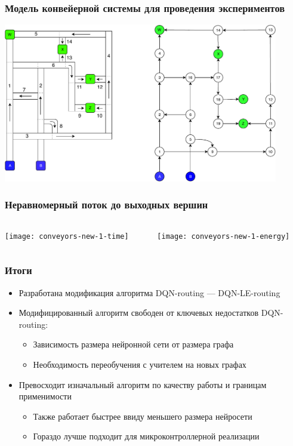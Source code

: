 \documentclass{beamer}
\begin{document}
\begin{frame}
  \frametitle{Модель конвейерной системы для проведения экспериментов}
  \begin{center}
    \includegraphics[width=0.9\textwidth]{conveyor-1-illustration-2} 
  \end{center}
\end{frame}


\begin{frame}
  \frametitle{Неравномерный поток до выходных вершин}
  \begin{columns}
    \begin{column}{0.5\textwidth}
      \texttt{[image: conveyors-new-1-time]}
    \end{column}
    \begin{column}{0.5\textwidth}
      \texttt{[image: conveyors-new-1-energy]}
    \end{column}
  \end{columns}
\end{frame}



\begin{frame}
  \frametitle{Итоги}
  \begin{itemize}
  \item Разработана модификация алгоритма DQN-routing --- DQN-LE-routing
  \item Модифицированный алгоритм свободен от ключевых недостатков DQN-routing:
    \begin{itemize}
    \item Зависимость размера нейронной сети от размера графа
    \item Необходимость переобучения с учителем на новых графах
    \end{itemize}
  \item Превосходит изначальный алгоритм по качеству работы и границам применимости
    \begin{itemize}
    \item Также работает быстрее ввиду меньшего размера нейросети
    \item Гораздо лучше подходит для микроконтроллерной реализации
    \end{itemize}
  \end{itemize}
\end{frame}
\end{document}
